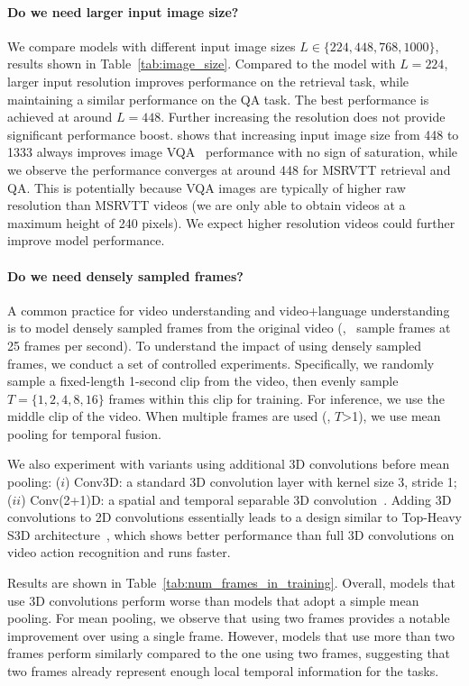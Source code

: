 \paragraph{Do we need larger input image size?} 
We compare models with different input image sizes $L \in \{224, 448, 768, 1000\}$, results shown in Table~\ref{tab:image_size}.
Compared to the model with $L{=}224$, larger input resolution improves performance on the retrieval task, while maintaining a similar performance on the QA task.
The best performance is achieved at around $L{=}448$. Further increasing the resolution does not provide significant performance boost.
\cite{jiang2020defense} shows that increasing input image size from 448 to 1333 always improves image VQA~\cite{antol2015vqa} performance with no sign of saturation, while we observe the performance converges at around 448 for MSRVTT retrieval and QA.
This is potentially because VQA images are typically of higher raw resolution than MSRVTT videos (we are only able to obtain videos at a maximum height of 240 pixels).
We expect higher resolution videos could further improve model performance.

\paragraph{Do we need densely sampled frames?} 
A common practice for video understanding and video+language understanding is to model densely sampled frames from the original video 
(\eg,~\cite{carreira2017quo,Xie_2018_ECCV} sample frames at 25 frames per second).
To understand the impact of using densely sampled frames, we conduct a set of controlled experiments. 
Specifically, we randomly sample a fixed-length 1-second clip from the video, then evenly sample $T {=} \{1, 2, 4, 8, 16\}$ frames within this clip for training. 
For inference, we use the middle clip of the video.
When multiple frames are used (\ie, $T$\textgreater1), we use mean pooling for temporal fusion. 

We also experiment with variants using additional 3D convolutions before mean pooling: ($i$) Conv3D: a standard 3D convolution layer with kernel size 3, stride 1; ($ii$) Conv(2+1)D: a spatial and temporal separable 3D convolution~\cite{tran2018closer,Xie_2018_ECCV}.
Adding 3D convolutions to 2D convolutions essentially leads to a design similar to Top-Heavy S3D architecture~\cite{Xie_2018_ECCV}, which shows better performance than full 3D convolutions on video action recognition and runs faster.

Results are shown in Table~\ref{tab:num_frames_in_training}.
Overall, models that use 3D convolutions perform worse than models that adopt a simple mean pooling. 
For mean pooling, we observe that using two frames provides a notable improvement over using a single frame.
However, models that use more than two frames perform similarly compared to the one using two frames, suggesting that two frames already represent enough local temporal information for the tasks.


